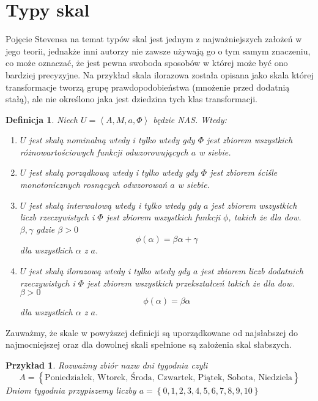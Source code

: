 \documentclass[12pt,a4paper]{report}
\newtheorem{definition}{Definicja}[chapter]
\newtheorem{przyklad}{Przykład}
\newcommand{\zbior}[1]{\left\lbrace {#1} \right\rbrace }
\newcommand{\tuple}[1]{\left\langle {#1} \right\rangle}
\begin{document}
\section{Typy skal}
Pojęcie Stevensa na temat typów skal jest jednym z najważniejszych założeń w jego teorii, jednakże inni autorzy nie zawsze używają go o tym samym znaczeniu, co może oznaczać, że jest pewna swoboda sposobów w której może być ono bardziej precyzyjne. Na przykład skala ilorazowa została opisana jako skala której transformacje tworzą grupę prawdopodobieństwa (mnożenie przed dodatnią stałą), ale nie określono jaka jest dziedzina tych klas transformacji.  
\begin{definition}
Niech $U=\tuple{A, M, a, \Phi}$ będzie NAS. Wtedy:
\begin{enumerate}
\item
$U$ jest skalą nominalną wtedy i tylko wtedy gdy $\Phi$ jest zbiorem wszystkich różnowartościowych funkcji odwzorowujących $a$ w siebie.
\item
$U$ jest skalą porządkową wtedy i tylko wtedy gdy $\Phi$ jest zbiorem ściśle monotonicznych rosnących odwzorowań $a$ w siebie.
\item
$U$ jest skalą interwałową wtedy i tylko wtedy gdy $a$ jest zbiorem wszystkich liczb rzeczywistych i $\Phi$ jest zbiorem wszystkich funkcji $\phi$, takich że dla dow. $\beta,\gamma$ gdzie $\beta>0$
\begin{equation*}
\phi(\alpha)=\beta\alpha+\gamma
\end{equation*}
dla wszystkich $\alpha$ z $a$.
\item
$U$ jest skalą ilorazową wtedy i tylko wtedy gdy $a$ jest zbiorem liczb dodatnich rzeczywistych i $\Phi$ jest zbiorem wszystkich przekształceń takich że dla dow. $\beta>0$
\begin{equation*}
\phi(\alpha)=\beta\alpha
\end{equation*}
dla wszystkich $\alpha$ z $a$.
\end{enumerate}
\end{definition}

Zauważmy, że skale w powyższej definicji są uporządkowane od najsłabszej do najmocniejszej oraz dla dowolnej skali spełnione są założenia skal słabszych.

\begin{przyklad}
Rozważmy zbiór nazw dni tygodnia czyli
  $$
A=\zbior{\textrm{Poniedziałek, Wtorek, Środa, Czwartek, Piątek, Sobota, Niedziela}}
$$
Dniom tygodnia przypiszemy liczby $a=\zbior{0,1,2,3,4,5,6,7,8,9,10}$
\end{przyklad}
\end{document}
